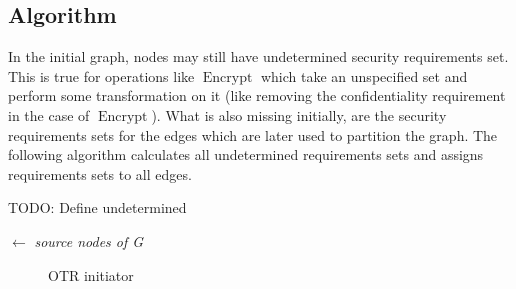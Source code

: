 \documentclass[a4paper]{article}
\DeclareMathOperator{\enc}{Encrypt}
\newcommand{\TODO}[1]{\small\noindent\color{red} TODO: #1\color{black}}
\begin{document}
\subsection{Algorithm}

In the initial graph, nodes may still have undetermined security requirements
set. This is true for operations like $\enc$ which take an unspecified set and
perform some transformation on it (like removing the confidentiality
requirement in the case of $\enc$). What is also missing initially, are the
security requirements sets for the edges which are later used to partition the
graph. The following algorithm calculates all undetermined requirements sets
and assigns requirements sets to all edges.

\TODO{Define undetermined}

\begin{algorithm}
    \Start $\leftarrow$ \emph{source nodes of G}\;
    \For{}
    {
    }
\end{algorithm}

\begin{landscape}
\thispagestyle{empty}
    \begin{figure}[ht]
        \centering
        \begin{dot2tex}[mathmode,scale=0.4]
            
        \end{dot2tex}
        \caption{OTR initiator}
    \end{figure}
\end{landscape}
\end{document}
